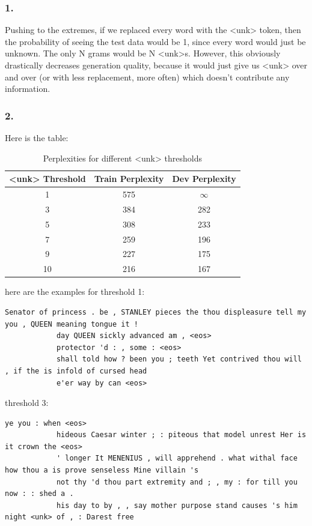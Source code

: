 \documentclass[12pt]{article}
\theoremstyle{definitionstyle}
\begin{document}
    \subsubsection*{1.}
    Pushing to the extremes, if we replaced every word with the <unk> token, then the probability of seeing the test data would be 1, since every word would just be unknown. The only N grams would be N <unk>s. However, this obviously drastically decreases generation quality, because it would just give us <unk> over and over (or with less replacement, more often) which doesn't contribute any information.
        
    \subsubsection*{2.} Here is the table:
        \begin{table}[H]
            \centering
            \begin{tabular}{|c|c|c|}
                \hline
                <unk> Threshold & Train Perplexity & Dev Perplexity \\
                \hline
                1 & 575 & $\infty$ \\
                3 & 384 & 282 \\
                5 & 308 & 233 \\
                7 & 259 & 196 \\
                9 & 227 & 175 \\
                10 & 216 & 167 \\
                \hline
            \end{tabular}
            \caption{Perplexities for different <unk> thresholds}
            \label{tab:unk_thresholds}
        \end{table}
        here are the examples for threshold 1:
        \begin{lstlisting}[breaklines]
            Senator of princess . be , STANLEY pieces the thou displeasure tell my you , QUEEN meaning tongue it ! 
            day QUEEN sickly advanced am , <eos> 
            protector 'd : , some : <eos> 
            shall told how ? been you ; teeth Yet contrived thou will , if the is infold of cursed head 
            e'er way by can <eos>
        \end{lstlisting}
        threshold 3:
        \begin{lstlisting}[breaklines]
            ye you : when <eos> 
            hideous Caesar winter ; : piteous that model unrest Her is it crown the <eos> 
            ' longer It MENENIUS , will apprehend . what withal face how thou a is prove senseless Mine villain 's 
            not thy 'd thou part extremity and ; , my : for till you now : : shed a . 
            his day to by , , say mother purpose stand causes 's him night <unk> of , : Darest free
        \end{lstlisting}
\end{document}
